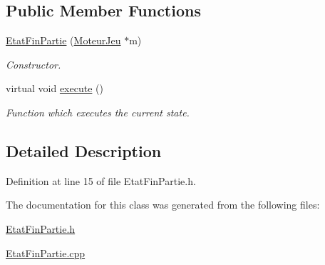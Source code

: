 \subsection*{Public Member Functions}
\begin{DoxyCompactItemize}
\item 
\hypertarget{class_etat_fin_partie_af30ddd160393d9852e3339add0ee1016}{
\hyperlink{class_etat_fin_partie_af30ddd160393d9852e3339add0ee1016}{EtatFinPartie} (\hyperlink{class_moteur_jeu}{MoteurJeu} $\ast$m)}
\label{class_etat_fin_partie_af30ddd160393d9852e3339add0ee1016}

\begin{DoxyCompactList}\small\item\em Constructor. \item\end{DoxyCompactList}\item 
\hypertarget{class_etat_fin_partie_a261f9f9e8c575129f149aa863ea704c4}{
virtual void \hyperlink{class_etat_fin_partie_a261f9f9e8c575129f149aa863ea704c4}{execute} ()}
\label{class_etat_fin_partie_a261f9f9e8c575129f149aa863ea704c4}

\begin{DoxyCompactList}\small\item\em Function which executes the current state. \item\end{DoxyCompactList}\end{DoxyCompactItemize}


\subsection{Detailed Description}


Definition at line 15 of file EtatFinPartie.h.



The documentation for this class was generated from the following files:\begin{DoxyCompactItemize}
\item 
\hyperlink{_etat_fin_partie_8h}{EtatFinPartie.h}\item 
\hyperlink{_etat_fin_partie_8cpp}{EtatFinPartie.cpp}\end{DoxyCompactItemize}
